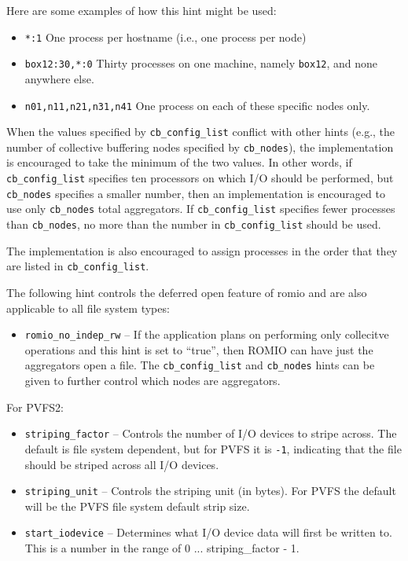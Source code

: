 Here are some examples of how this hint might be used:
\begin{itemize}
\item \texttt{*:1} One process per hostname (i.e., one process per node)
\item \texttt{box12:30,*:0} Thirty processes on one machine, namely
      \texttt{box12}, and none anywhere else.
\item \texttt{n01,n11,n21,n31,n41} One process on each of these specific
      nodes only.
\end{itemize}

When the values specified by \texttt{cb\_config\_list} conflict with
other hints (e.g., the number of collective buffering nodes specified by
\texttt{cb\_nodes}), the implementation is encouraged to take the minimum
of the two values.  In other words, if \texttt{cb\_config\_list} specifies
ten processors on which I/O should be performed, but \texttt{cb\_nodes}
specifies a smaller number, then an implementation is encouraged to use
only \texttt{cb\_nodes} total aggregators. If \texttt{cb\_config\_list}
specifies fewer processes than \texttt{cb\_nodes}, no more than the
number in \texttt{cb\_config\_list} should be used.

The implementation is also encouraged to assign processes in the order
that they are listed in \texttt{cb\_config\_list}.

The following hint controls the deferred open feature of romio and are also
applicable to all file system types: 
\begin{itemize}
\item \texttt{romio\_no\_indep\_rw} -- If the application plans on performing only 
   collecitve operations and this hint is set to ``true'', then ROMIO can
   have just the aggregators open a file.   The \texttt{cb\_config\_list} and
   \texttt{cb\_nodes} hints can be given to further control which nodes are
   aggregators.  
\end{itemize}

For PVFS2:
\begin{itemize}
\item \texttt{striping\_factor} -- Controls the number of I/O devices to
stripe across.  The default is file system dependent, but for PVFS it is
\texttt{-1}, indicating that the file should be striped across all I/O
devices.
\item \texttt{striping\_unit} --  Controls the striping unit (in bytes).
For PVFS the default will be the PVFS file system default strip size.
\item \texttt{start\_iodevice} -- Determines what I/O device data will
first be written to.  This is a number in the range of 0 ...
striping\_factor - 1.
\end{itemize}

